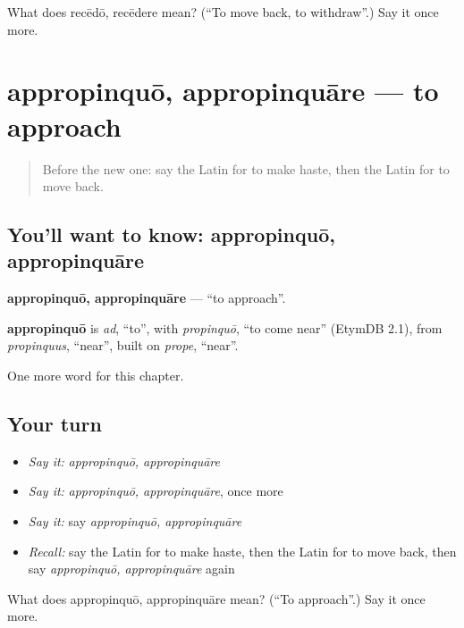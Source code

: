 \begin{tcolorbox}[breakable,colback=teal!4,colframe=teal!35!black,title={Before you move on}]
What does recēdō, recēdere mean? (\textquotedblleft{}To move back, to withdraw\textquotedblright{}.) Say it once more.
\end{tcolorbox}
\section[appropinquō, appropinquāre]{appropinquō, appropinquāre — to approach}

\label{lesson:LA-C169-appropinquo}



\begin{quote}
Before the new one: say the Latin for to make haste, then the Latin for to move back.
\end{quote}

\subsection*{You'll want to know: appropinquō, appropinquāre}
\textbf{appropinquō, appropinquāre} — \textquotedblleft{}to approach\textquotedblright{}.

\begin{cousinweb}
\textbf{appropinquō} is \emph{ad}, \textquotedblleft{}to\textquotedblright{}, with \emph{propinquō}, \textquotedblleft{}to come near\textquotedblright{} (EtymDB 2.1), from \emph{propinquus}, \textquotedblleft{}near\textquotedblright{}, built on \emph{prope}, \textquotedblleft{}near\textquotedblright{}.
\end{cousinweb}

\begin{grammarlens}[title={What you've built}]
One more word for this chapter.
\end{grammarlens}

\subsection*{Your turn}
\begin{itemize}
\raggedright
  \item \emph{Say it:} \emph{appropinquō, appropinquāre}
  \item \emph{Say it:} \emph{appropinquō, appropinquāre}, once more
  \item \emph{Say it:} say \emph{appropinquō, appropinquāre}
  \item \emph{Recall:} say the Latin for to make haste, then the Latin for to move back, then say \emph{appropinquō, appropinquāre} again
\end{itemize}

\begin{tcolorbox}[breakable,colback=teal!4,colframe=teal!35!black,title={Before you move on}]
What does appropinquō, appropinquāre mean? (\textquotedblleft{}To approach\textquotedblright{}.) Say it once more.
\end{tcolorbox}
